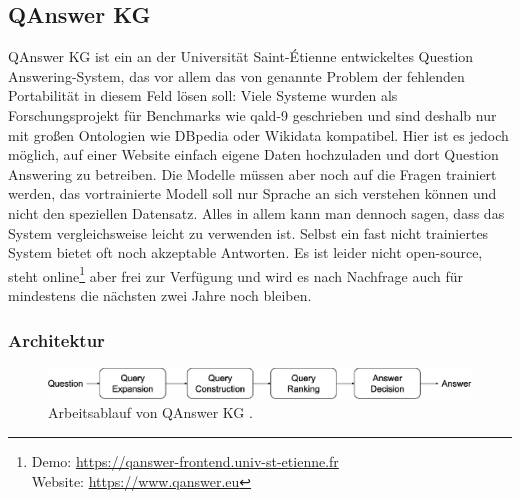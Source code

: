 \subsection{QAnswer KG}

QAnswer KG \citep{qanswer} ist ein an der Universität Saint-Étienne entwickeltes Question Answering-System,
das vor allem das von \citet{diefenbachkbqa} genannte Problem der fehlenden Portabilität in diesem Feld lösen soll:
Viele Systeme wurden als Forschungsprojekt für Benchmarks wie \ac{qald}-9 geschrieben und sind deshalb nur mit großen Ontologien wie DBpedia oder Wikidata kompatibel.
Hier ist es jedoch möglich, auf einer Website einfach eigene Daten hochzuladen und dort Question Answering zu betreiben.
Die Modelle müssen aber noch auf die Fragen trainiert werden, das vortrainierte Modell soll nur Sprache an sich verstehen können und nicht den speziellen Datensatz.
Alles in allem kann man dennoch sagen, dass das System vergleichsweise leicht zu verwenden ist.
Selbst ein fast nicht trainiertes System bietet oft noch akzeptable Antworten.
Es ist leider nicht open-source, steht online\footnote{Demo: \url{https://qanswer-frontend.univ-st-etienne.fr}\\Website: \url{https://www.qanswer.eu}} aber frei zur Verfügung und wird es nach Nachfrage auch für mindestens die nächsten zwei Jahre noch bleiben.

\subsubsection{Architektur}

\begin{figure}%
\centering
\includegraphics[width=\textwidth, height=\textheight, keepaspectratio]{Images/QAnswerWorkflow.png}
\caption[QAnswer KG Arbeitsablauf]{Arbeitsablauf von QAnswer KG \citep{qanswer}.}
\label{fig:qanswerworkflow}
\end{figure}

